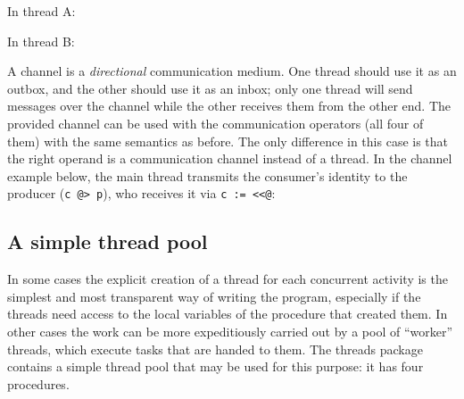 In thread A:


In thread B:


A channel is a \emph{directional} communication medium.  One thread should use
it as an outbox, and the other should use it as an inbox; only one thread will
send messages over the channel while the other receives them from the other
end. The provided channel can be used with the communication operators (all four
of them) with the same semantics as before. The only difference in this case is
that the right operand is a communication channel instead of a thread.  In the
channel example below, the main thread transmits the consumer's identity to the
producer (\texttt{c @> p}), who receives it via \texttt{c := <{}<@}:


\subsection*{A simple thread pool}
In some cases the explicit creation of a thread for each concurrent activity is
the simplest and most transparent way of writing the program, especially if the
threads need access to the local variables of the procedure that created them.
In other cases the work can be more expeditiously carried out by a pool of
``worker'' threads, which execute tasks that are handed to them.  The threads
package contains a simple thread pool that may be used for this purpose: it has
four procedures.

